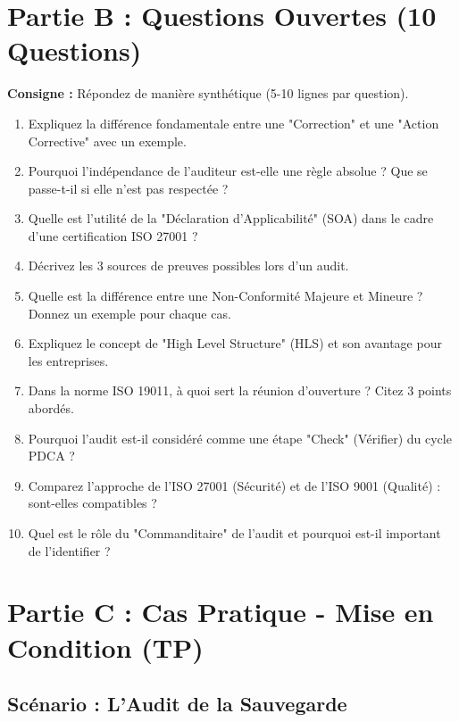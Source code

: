 \section{Partie B : Questions Ouvertes (10 Questions)}

\textbf{Consigne :} Répondez de manière synthétique (5-10 lignes par question).

\begin{enumerate}
    \item Expliquez la différence fondamentale entre une "Correction" et une "Action Corrective" avec un exemple.
    \item Pourquoi l'indépendance de l'auditeur est-elle une règle absolue ? Que se passe-t-il si elle n'est pas respectée ?
    \item Quelle est l'utilité de la "Déclaration d'Applicabilité" (SOA) dans le cadre d'une certification ISO 27001 ?
    \item Décrivez les 3 sources de preuves possibles lors d'un audit.
    \item Quelle est la différence entre une Non-Conformité Majeure et Mineure ? Donnez un exemple pour chaque cas.
    \item Expliquez le concept de "High Level Structure" (HLS) et son avantage pour les entreprises.
    \item Dans la norme ISO 19011, à quoi sert la réunion d'ouverture ? Citez 3 points abordés.
    \item Pourquoi l'audit est-il considéré comme une étape "Check" (Vérifier) du cycle PDCA ?
    \item Comparez l'approche de l'ISO 27001 (Sécurité) et de l'ISO 9001 (Qualité) : sont-elles compatibles ?
    \item Quel est le rôle du "Commanditaire" de l'audit et pourquoi est-il important de l'identifier ?
\end{enumerate}

\section{Partie C : Cas Pratique - Mise en Condition (TP)}

\subsection{Scénario : L'Audit de la Sauvegarde}

